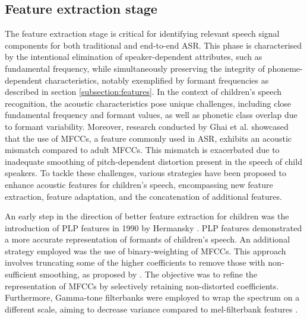 \subsection{Feature extraction stage}%
The feature extraction stage is critical for identifying relevant speech signal components for both traditional and end-to-end \ac{ASR}. This phase is characterised by the intentional elimination of speaker-dependent attributes, such as fundamental frequency, while simultaneously preserving the integrity of phoneme-dependent characteristics, notably exemplified by formant frequencies as described in section \ref{subsection:features}. In the context of children's speech recognition, the acoustic characteristics pose unique challenges, including close fundamental frequency and formant values, as well as phonetic class overlap due to formant variability. 
Moreover, research conducted by Ghai et al. \cite{ghai2009exploring,ghai2011addressing} showcased that the use of \acp{MFCC}, a feature commonly used in \ac{ASR}, exhibits an acoustic mismatch compared to adult \acp{MFCC}. This mismatch is exacerbated due to inadequate smoothing of pitch-dependent distortion present in the speech of child speakers. To tackle these challenges, various strategies have been proposed to enhance acoustic features for children's speech, encompassing new feature extraction, feature adaptation, and the concatenation of additional features.


An early step in the direction of better feature extraction for children was the introduction of \ac{PLP} features in 1990 by Hermansky \cite{Hermansky1990PerceptualLP}. \ac{PLP} features demonstrated a more accurate representation of formants of children's speech.  An additional strategy employed was the use of binary-weighting of \acp{MFCC}. This approach involves truncating some of the higher coefficients to remove those with non-sufficient smoothing, as proposed by \cite{ghai2009exploring}. The objective was to refine the representation of \acp{MFCC} by selectively retaining non-distorted coefficients. Furthermore, Gamma-tone filterbanks were employed to wrap the spectrum on a different scale, aiming to decrease variance compared to mel-filterbank features \cite{shahnawazuddin2023gammatone}.

